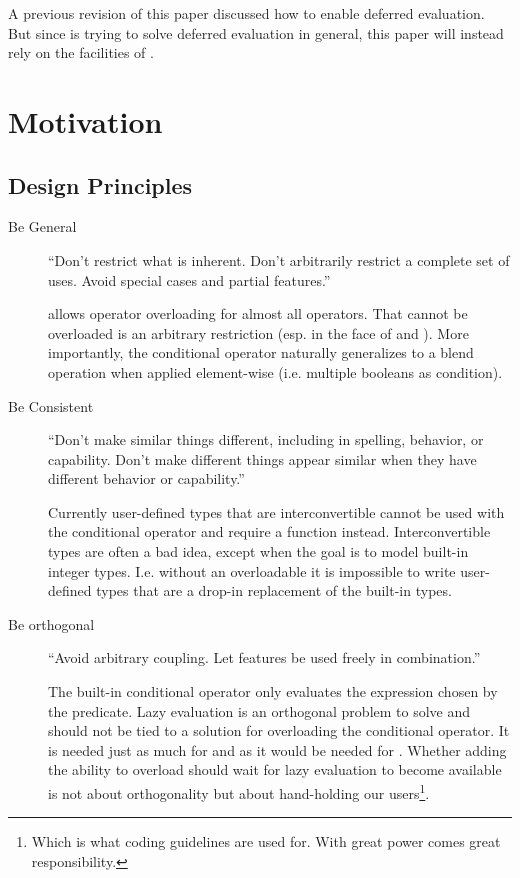 A previous revision of this paper discussed how to enable deferred evaluation.
But since \textcite{P0927R2} is trying to solve deferred evaluation in general, this paper will instead rely on the facilities of \cite{P0927R2}.

\section{Motivation}
\subsection{Design Principles}
\begin{description}
  \item[Be General] “Don’t restrict what is inherent.
    Don’t arbitrarily restrict a complete set of uses.
    Avoid special cases and partial features.” \cite{P0745R0}

    \CC{} allows operator overloading for almost all operators.
    That  cannot be overloaded is an arbitrary restriction (esp. in the face of  and ).
    More importantly, the conditional operator naturally generalizes to a blend operation when applied element-wise (i.e. multiple booleans as condition).

  \item[Be Consistent] “Don’t make similar things different, including in spelling, behavior, or capability.
    Don’t make different things appear similar when they have different behavior or capability.”

    Currently user-defined types that are interconvertible cannot be used with the conditional operator and require a function instead.
    Interconvertible types are often a bad idea, except when the goal is to model built-in integer types.
    I.e. without an overloadable  it is impossible to write user-defined types that are a drop-in replacement of the built-in types.

  \item[Be orthogonal] “Avoid arbitrary coupling.
    Let features be used freely in combination.”

    The built-in conditional operator only evaluates the expression chosen by the predicate.
    Lazy evaluation is an orthogonal problem to solve and should not be tied to a solution for overloading the conditional operator.
    It is needed just as much for  and  as it would be needed for .
    Whether adding the ability to overload  should wait for lazy evaluation to become available is not about orthogonality but about hand-holding our users\footnote{Which is what coding guidelines are used for. With great power comes great responsibility.}.
\end{description}

